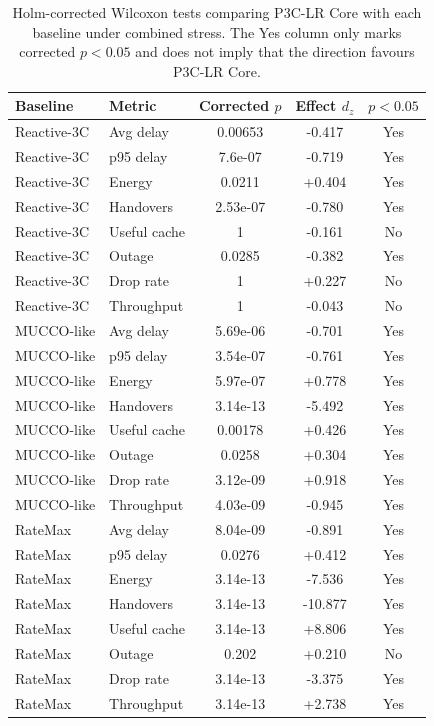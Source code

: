 \begin{table}[!t]
\centering
\caption{Holm-corrected Wilcoxon tests comparing P3C-LR Core with each baseline under combined stress. The Yes column only marks corrected $p<0.05$ and does not imply that the direction favours P3C-LR Core.}
\label{tab:significance}
\tiny
\begin{tabular}{llccc}
\toprule
Baseline & Metric & Corrected $p$ & Effect $d_z$ & $p<0.05$ \\
\midrule
Reactive-3C & Avg delay & 0.00653 & -0.417 & Yes \\
Reactive-3C & p95 delay & 7.6e-07 & -0.719 & Yes \\
Reactive-3C & Energy & 0.0211 & +0.404 & Yes \\
Reactive-3C & Handovers & 2.53e-07 & -0.780 & Yes \\
Reactive-3C & Useful cache & 1 & -0.161 & No \\
Reactive-3C & Outage & 0.0285 & -0.382 & Yes \\
Reactive-3C & Drop rate & 1 & +0.227 & No \\
Reactive-3C & Throughput & 1 & -0.043 & No \\
MUCCO-like & Avg delay & 5.69e-06 & -0.701 & Yes \\
MUCCO-like & p95 delay & 3.54e-07 & -0.761 & Yes \\
MUCCO-like & Energy & 5.97e-07 & +0.778 & Yes \\
MUCCO-like & Handovers & 3.14e-13 & -5.492 & Yes \\
MUCCO-like & Useful cache & 0.00178 & +0.426 & Yes \\
MUCCO-like & Outage & 0.0258 & +0.304 & Yes \\
MUCCO-like & Drop rate & 3.12e-09 & +0.918 & Yes \\
MUCCO-like & Throughput & 4.03e-09 & -0.945 & Yes \\
RateMax & Avg delay & 8.04e-09 & -0.891 & Yes \\
RateMax & p95 delay & 0.0276 & +0.412 & Yes \\
RateMax & Energy & 3.14e-13 & -7.536 & Yes \\
RateMax & Handovers & 3.14e-13 & -10.877 & Yes \\
RateMax & Useful cache & 3.14e-13 & +8.806 & Yes \\
RateMax & Outage & 0.202 & +0.210 & No \\
RateMax & Drop rate & 3.14e-13 & -3.375 & Yes \\
RateMax & Throughput & 3.14e-13 & +2.738 & Yes \\

\end{tabular}
\end{table}

